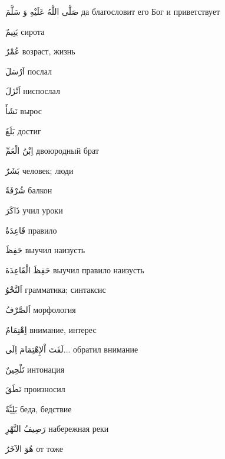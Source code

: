 \documentclass[a5paper]{article}
\newcommand\textstyleDropCaps[1]{#1}
\newcommand\textstyleCaptioncharacters[1]{#1}
\begin{document}
\textstyleCaptioncharacters{صَلَّى اللَّهُ عَلَيْهِ وَ سَلَّمَ }\textstyleDropCaps{да благословит его Бог и приветствует‎}

\textstyleCaptioncharacters{يَتِيمٌ }\textstyleDropCaps{сирота‎}

\textstyleCaptioncharacters{عُمْرٌ }\textstyleDropCaps{возраст, жизнь‎}

\textstyleCaptioncharacters{اَرْسَلَ }\textstyleDropCaps{послал‎}

\textstyleCaptioncharacters{اَنْزَلَ }\textstyleDropCaps{ниспослал‎}

\textstyleCaptioncharacters{نَشَأَ }\textstyleDropCaps{вырос‎}

\textstyleCaptioncharacters{بَلَغَ }\textstyleDropCaps{достиг‎}

\textstyleCaptioncharacters{اِبْنُ الْعَمِّ }\textstyleDropCaps{двоюродный брат‎}

\textstyleCaptioncharacters{بَشَرٌ }\textstyleDropCaps{человек; люди‎}

\textstyleCaptioncharacters{شُرْفَةٌ }\textstyleDropCaps{балкон‎}

\textstyleCaptioncharacters{ذَاكَرَ }\textstyleDropCaps{учил уроки‎}

\textstyleCaptioncharacters{قَاعِدَةٌ }\textstyleDropCaps{правило‎}

\textstyleCaptioncharacters{حَفِظَ }\textstyleDropCaps{выучил наизусть‎}

\textstyleCaptioncharacters{حَفِظَ الْقَاعِدَةَ }\textstyleDropCaps{выучил правило наизусть‎}

\textstyleCaptioncharacters{اَلنَّحْوُ }\textstyleDropCaps{грамматика; син­таксис‎}

\textstyleCaptioncharacters{اَلصَّرْفُ }\textstyleDropCaps{морфология‎}

\textstyleCaptioncharacters{اِهْتِمَامٌ }\textstyleDropCaps{внимание, ин­терес‎}

\textstyleCaptioncharacters{لَفَتَ اْلإِهْتِمَامَ اِلَى...ِ }\textstyleDropCaps{обратил внимание‎}

\textstyleCaptioncharacters{تَلْحِينٌ }\textstyleDropCaps{интонация‎}

\textstyleCaptioncharacters{نَطَقَ }\textstyleDropCaps{произносил‎}

\textstyleCaptioncharacters{بَلِيَّةٌ }\textstyleDropCaps{беда, бедствие‎}

\textstyleCaptioncharacters{رَصِيفُ النَّهْرِ }\textstyleDropCaps{набереж­ная реки‎}

\textstyleCaptioncharacters{هُوَ الآخَرُ }\textstyleDropCaps{от тоже‎}
\end{document}

